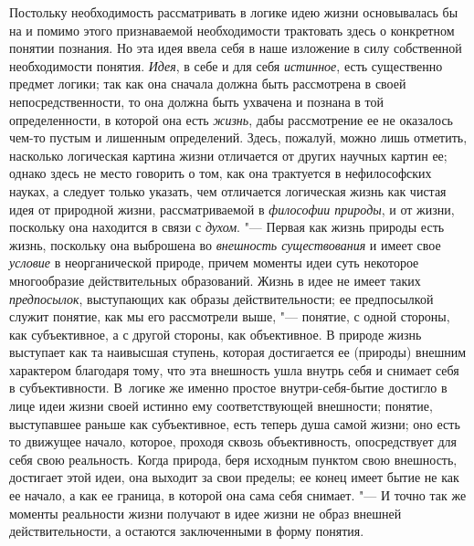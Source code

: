 {{Постольку необходимость рассматривать в логике идею жизни
основывалась бы на и помимо этого признаваемой необходимости трактовать
здесь о конкретном понятии познания. Но эта идея ввела себя в наше
изложение в силу собственной необходимости понятия.
{\em Идея}, в себе и для
себя {\em истинное}, есть
существенно предмет логики; так как она сначала должна быть рассмотрена в
своей непосредственности, то она должна быть ухвачена и познана в той
определенности, в которой она есть
{\em жизнь}, дабы
рассмотрение ее не оказалось чем-то пустым и лишенным определений. Здесь,
пожалуй, можно лишь отметить, насколько логическая картина жизни отличается
от других научных картин ее; однако здесь не место говорить о том, как она
трактуется в нефилософских науках, а следует только указать, чем отличается
логическая жизнь как чистая идея от природной жизни, рассматриваемой в
{\em философии природы},
и от жизни, поскольку она находится в связи с
{\em духом}. "--- Первая как
жизнь природы есть жизнь, поскольку она выброшена во
{\em внешность существования}
и имеет свое
{\em условие} в
неорганической природе, причем моменты идеи суть некоторое многообразие
действительных образований. Жизнь в идее не имеет таких
{\em предпосылок},
выступающих как образы действительности; ее предпосылкой
служит понятие, как мы его рассмотрели выше, "--- понятие, с
одной стороны, как субъективное, а с другой стороны, как объективное. В
природе жизнь выступает как та наивысшая ступень, которая достигается ее
(природы) внешним характером благодаря тому, что эта внешность ушла внутрь
себя и снимает себя в субъективности. В~логике же именно простое
внутри-себя-бытие достигло в лице идеи жизни своей истинно ему
соответствующей внешности; понятие, выступавшее раньше как субъективное,
есть теперь душа самой жизни; оно есть то движущее начало, которое, проходя
сквозь объективность, опосредствует для себя свою реальность. Когда
природа, беря исходным пунктом свою внешность, достигает этой идеи, она
выходит за свои пределы; ее конец имеет бытие не как ее начало, а как ее
граница, в которой она сама себя снимает. "--- И точно так же
моменты реальности жизни получают в идее жизни не образ
внешней действительности, а остаются заключенными в форму понятия.

}}
